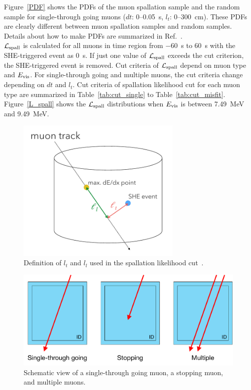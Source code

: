 Figure~\ref{PDF} shows the PDFs of the muon spallation sample and the random sample for single-through going muons ($dt$: 0--0.05~s, $l_{t}$: 0--300~cm).
These PDFs are clearly different between muon spallation samples and random samples.
Details about how to make PDFs are summarized in Ref.~\cite{2023HaradaPhD}.\\
\hs
$\mathcal{L}_{\rm spall}$ is calculated for all muons in time region from $-$60~s to 60~s with the SHE-triggered event as 0~s.
If just one value of $\mathcal{L}_{\rm spall}$ exceeds the cut criterion, the SHE-triggered event is removed.
Cut criteria of $\mathcal{L}_{\rm spall}$ depend on muon type and $E_{\rm vis}$.
For single-through going and multiple muons, the cut criteria change depending on $dt$ and $l_{t}$.
Cut criteria of spallation likelihood cut for each muon type are summarized in Table~\ref{tab:cut_single} to Table~\ref{tab:cut_misfit}.
Figure~\ref{L_spall} shows the $\mathcal{L}_{\rm spall}$ distributions when $E_{\rm vis}$ is between 7.49~MeV and 9.49~MeV.

\begin{figure}[tbp]
	\centering
	\includegraphics[width=8cm]{Figures/Selection/def_likelihood}
	\caption[Definition of $l_{t}$ and $l_{l}$ used in the spallation likelihood cut]{
	Definition of $l_{t}$ and $l_{l}$ used in the spallation likelihood cut~\cite{2023HaradaPhD}.
	}\label{def_likelihood}
\end{figure}

\begin{figure}[tbp]
	\centering
	\includegraphics[width=12cm]{Figures/Selection/muon_type}
	\caption[Schematic view of a single-through going muon, a stopping muon, and multiple muons]{
	Schematic view of a single-through going muon, a stopping muon, and multiple muons.
	}\label{muon_type}
\end{figure}


